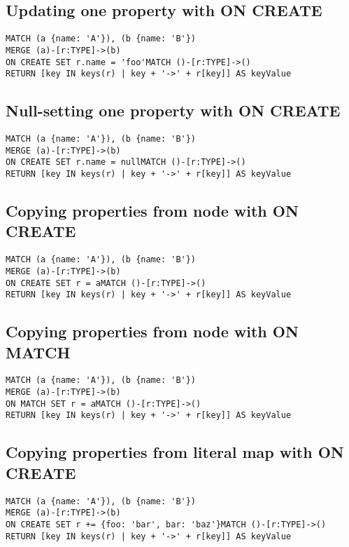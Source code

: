 \subsection{Updating one property with ON CREATE}

\begin{lstlisting}
MATCH (a {name: 'A'}), (b {name: 'B'})
MERGE (a)-[r:TYPE]->(b)
ON CREATE SET r.name = 'foo'MATCH ()-[r:TYPE]->()
RETURN [key IN keys(r) | key + '->' + r[key]] AS keyValue
\end{lstlisting}

\subsection{Null-setting one property with ON CREATE}

\begin{lstlisting}
MATCH (a {name: 'A'}), (b {name: 'B'})
MERGE (a)-[r:TYPE]->(b)
ON CREATE SET r.name = nullMATCH ()-[r:TYPE]->()
RETURN [key IN keys(r) | key + '->' + r[key]] AS keyValue
\end{lstlisting}

\subsection{Copying properties from node with ON CREATE}

\begin{lstlisting}
MATCH (a {name: 'A'}), (b {name: 'B'})
MERGE (a)-[r:TYPE]->(b)
ON CREATE SET r = aMATCH ()-[r:TYPE]->()
RETURN [key IN keys(r) | key + '->' + r[key]] AS keyValue
\end{lstlisting}

\subsection{Copying properties from node with ON MATCH}

\begin{lstlisting}
MATCH (a {name: 'A'}), (b {name: 'B'})
MERGE (a)-[r:TYPE]->(b)
ON MATCH SET r = aMATCH ()-[r:TYPE]->()
RETURN [key IN keys(r) | key + '->' + r[key]] AS keyValue
\end{lstlisting}

\subsection{Copying properties from literal map with ON CREATE}

\begin{lstlisting}
MATCH (a {name: 'A'}), (b {name: 'B'})
MERGE (a)-[r:TYPE]->(b)
ON CREATE SET r += {foo: 'bar', bar: 'baz'}MATCH ()-[r:TYPE]->()
RETURN [key IN keys(r) | key + '->' + r[key]] AS keyValue
\end{lstlisting}

